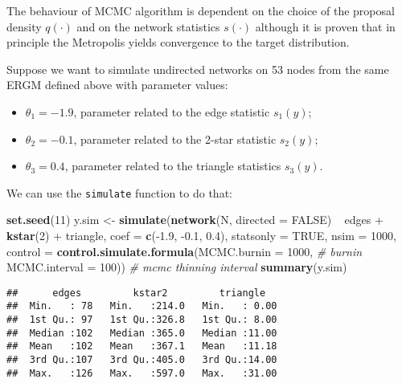 \documentclass[]{book}
\newenvironment{Shaded}{\begin{snugshade}}{\end{snugshade}}
\newcommand{\KeywordTok}[1]{\textcolor[rgb]{0.13,0.29,0.53}{\textbf{{#1}}}}
\newcommand{\DataTypeTok}[1]{\textcolor[rgb]{0.13,0.29,0.53}{{#1}}}
\newcommand{\DecValTok}[1]{\textcolor[rgb]{0.00,0.00,0.81}{{#1}}}
\newcommand{\FloatTok}[1]{\textcolor[rgb]{0.00,0.00,0.81}{{#1}}}
\newcommand{\StringTok}[1]{\textcolor[rgb]{0.31,0.60,0.02}{{#1}}}
\newcommand{\CommentTok}[1]{\textcolor[rgb]{0.56,0.35,0.01}{\textit{{#1}}}}
\newcommand{\OtherTok}[1]{\textcolor[rgb]{0.56,0.35,0.01}{{#1}}}
\newcommand{\NormalTok}[1]{{#1}}
\providecommand{\tightlist}{%
  \setlength{\itemsep}{0pt}\setlength{\parskip}{0pt}}
\begin{document}
The behaviour of MCMC algorithm is dependent on the choice of the
proposal density \(q(\cdot)\) and on the network statistics \(s(\cdot)\)
although it is proven that in principle the Metropolis yields
convergence to the target distribution.

Suppose we want to simulate undirected networks on 53 nodes from the
same ERGM defined above with parameter values:

\begin{itemize}
\tightlist
\item
  \(\theta_1 = -1.9\), parameter related to the edge statistic
  \(s_1(y)\);
\item
  \(\theta_2 = -0.1\), parameter related to the 2-star statistic
  \(s_2(y)\);
\item
  \(\theta_3 = 0.4\), parameter related to the triangle statistics
  \(s_3(y)\).
\end{itemize}

We can use the \texttt{simulate} function to do that:

\begin{Shaded}
\begin{Highlighting}[]
\KeywordTok{set.seed}\NormalTok{(}\DecValTok{11}\NormalTok{)}
\NormalTok{y.sim <-}\StringTok{ }\KeywordTok{simulate}\NormalTok{(}\KeywordTok{network}\NormalTok{(N, }\DataTypeTok{directed =} \OtherTok{FALSE}\NormalTok{) ~}\StringTok{ }\NormalTok{edges +}\StringTok{ }\KeywordTok{kstar}\NormalTok{(}\DecValTok{2}\NormalTok{) +}\StringTok{ }\NormalTok{triangle, }
                  \DataTypeTok{coef =} \KeywordTok{c}\NormalTok{(-}\FloatTok{1.9}\NormalTok{, -}\FloatTok{0.1}\NormalTok{, }\FloatTok{0.4}\NormalTok{),}
                  \DataTypeTok{statsonly =} \OtherTok{TRUE}\NormalTok{,}
                  \DataTypeTok{nsim =} \DecValTok{1000}\NormalTok{,}
                  \DataTypeTok{control =} \KeywordTok{control.simulate.formula}\NormalTok{(}\DataTypeTok{MCMC.burnin =} \DecValTok{1000}\NormalTok{,   }\CommentTok{# burnin }
                                                     \DataTypeTok{MCMC.interval =} \DecValTok{100}\NormalTok{)) }\CommentTok{# mcmc thinning interval }
\KeywordTok{summary}\NormalTok{(y.sim)}
\end{Highlighting}
\end{Shaded}

\begin{verbatim}
##      edges         kstar2         triangle    
##  Min.   : 78   Min.   :214.0   Min.   : 0.00  
##  1st Qu.: 97   1st Qu.:326.8   1st Qu.: 8.00  
##  Median :102   Median :365.0   Median :11.00  
##  Mean   :102   Mean   :367.1   Mean   :11.18  
##  3rd Qu.:107   3rd Qu.:405.0   3rd Qu.:14.00  
##  Max.   :126   Max.   :597.0   Max.   :31.00
\end{verbatim}
\end{document}
